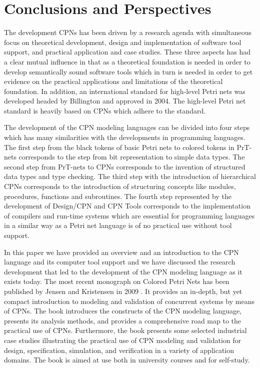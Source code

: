 \section{Conclusions and Perspectives}

The development CPNs has been driven by a research agenda with
simultaneous focus on theoretical development, design and
implementation of software tool support, and practical application and
case studies. These three aspects has had a clear mutual influence in
that as a theoretical foundation is needed in order to develop
semantically sound software tools which in turn is needed in order to
get evidence on the practical applications and limitations of the
theoretical foundation. In addition, an international standard for
high-level Petri nets was developed headed by Billington
\cite{hcpnstandard} and approved in 2004. The high-level Petri net
standard is heavily based on CPNs which adhere to the standard.


The development of the CPN modeling languages can be divided into
four steps which has many similarities with the developments in
programming languages. The first step from the black tokens of basic
Petri nets to colored tokens in PrT-nets corresponds to the step from
bit representation to simple data types. The second step from PrT-nets
to CPNs corresponds to the invention of structured data types and type
checking. The third step with the introduction of hierarchical CPNs
corresponds to the introduction of structuring concepts like modules,
procedures, functions and subroutines. The fourth step represented by
the development of Design/CPN and CPN Tools corresponds to the
implementation of compilers and run-time systems which are essential
for programming languages in a similar way as a Petri net language is
of no practical use without tool support. 

In this paper we have provided an overview and an introduction to the
CPN language and its computer tool support and we have discussed the
research development that led to the development of the CPN modeling
language as it exists today. The most recent monograph on Colored
Petri Nets has been published by Jensen and Kristensen in 2009
\cite{newcpnbook}. It provides an in-depth, but yet compact
introduction to modeling and validation of concurrent systems by means
of CPNs. The book introduces the constructs of the CPN modeling
language, presents its analysis methods, and provides a comprehensive
road map to the practical use of CPNs. Furthermore, the book presents
some selected industrial case studies illustrating the practical use
of CPN modeling and validation for design, specification, simulation,
and verification in a variety of application domains. The book is
aimed at use both in university courses and for self-study.

